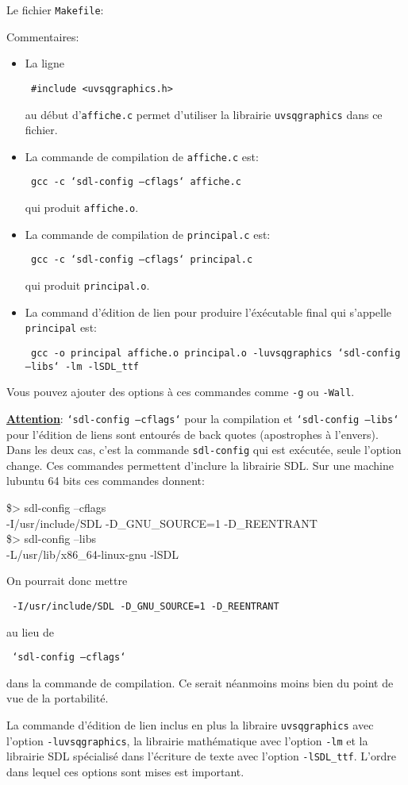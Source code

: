 \documentclass{report}
\newcommand\code[1]{
\begin{mdframed}[linecolor=purple,backgroundcolor=blue!10]
{\tt
#1
}
\end{mdframed}
}
\begin{document}
Le fichier \texttt{Makefile}:
\code{  }

\vspace{5mm}
Commentaires:
\begin{itemize}
\item La ligne
	\code{\#include <uvsqgraphics.h>}
	au début d'\texttt{affiche.c} permet d'utiliser la librairie \texttt{uvsqgraphics} dans ce fichier.
\item La commande de compilation de \texttt{affiche.c} est:
	\code{gcc -c `sdl-config --cflags` affiche.c}
	qui produit \texttt{affiche.o}.
\item La commande de compilation de \texttt{principal.c} est:
	\code{gcc -c `sdl-config --cflags` principal.c}
	qui produit \texttt{principal.o}.
\item La command d'édition de lien pour produire l'éxécutable final qui s'appelle \texttt{principal} est:
	\code{gcc -o principal affiche.o principal.o -luvsqgraphics `sdl-config --libs` -lm -lSDL\_ttf}
\end{itemize}

Vous pouvez ajouter des options à ces commandes comme \texttt{-g} ou \texttt{-Wall}.

\vspace{5mm}
\noindent
\underline{\bf Attention}: \texttt{`sdl-config --cflags`} pour la compilation et \texttt{`sdl-config --libs`} pour l'édition de liens sont entourés de back quotes (apostrophes à l'envers).
Dans les deux cas, c'est la commande \texttt{sdl-config} qui est exécutée, seule l'option change. Ces commandes permettent d'inclure la librairie SDL.
Sur une machine lubuntu 64 bits ces commandes donnent:
\code{
\$> sdl-config --cflags\\
-I/usr/include/SDL -D\_GNU\_SOURCE=1 -D\_REENTRANT\\
\$> sdl-config --libs\\
-L/usr/lib/x86\_64-linux-gnu -lSDL
}
On pourrait donc mettre
\code{-I/usr/include/SDL -D\_GNU\_SOURCE=1 -D\_REENTRANT}
au lieu de
\code{`sdl-config --cflags`}
dans la commande de compilation. Ce serait néanmoins moins bien du point de vue de la portabilité.

\vspace{5mm}
La commande d'édition de lien inclus en plus la libraire \texttt{uvsqgraphics} avec l'option \texttt{-luvsqgraphics}, 
la librairie mathématique avec l'option \texttt{-lm} et la librairie SDL spécialisé dans l'écriture de texte avec l'option 
\texttt{-lSDL\_ttf}. L'ordre dans lequel ces options sont mises est important.
\end{document}
